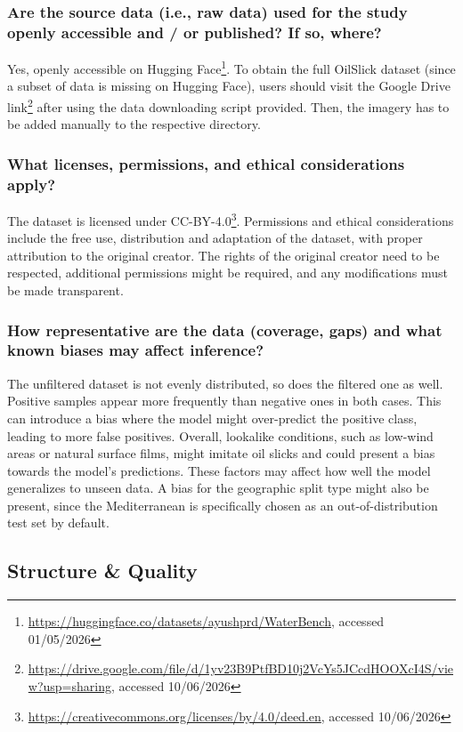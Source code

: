\documentclass[sigconf]{acmart}
\begin{document}
\subsubsection{Are the source data (i.e., raw data) used for the study openly accessible and / or published? If so, where?} Yes, openly accessible on Hugging Face\footnote{\url{https://huggingface.co/datasets/ayushprd/WaterBench}, accessed 01/05/2026}. To obtain the full OilSlick dataset (since a subset of data is missing on Hugging Face), users should visit the Google Drive link\footnote{\url{https://drive.google.com/file/d/1yv23B9PtfBD10j2VcYs5JCcdHOOXcI4S/view?usp=sharing}, accessed 10/06/2026} after using the data downloading script provided. Then, the imagery has to be added manually to the respective directory.
\subsubsection{What licenses, permissions, and ethical considerations apply?} The dataset is licensed under CC-BY-4.0\footnote{\url{https://creativecommons.org/licenses/by/4.0/deed.en}, accessed 10/06/2026}. Permissions and ethical considerations include the free use, distribution and adaptation of the dataset, with proper attribution to the original creator. The rights of the original creator need to be respected, additional permissions might be required, and any modifications must be made transparent.
\subsubsection{How representative are the data (coverage, gaps) and what known biases may affect inference?} The unfiltered dataset is not evenly distributed, so does the filtered one as well. Positive samples appear more frequently than negative ones in both cases. This can introduce a bias where the model might over-predict the positive class, leading to more false positives. Overall, lookalike conditions, such as low-wind areas or natural surface films, might imitate oil slicks and could present a bias towards the model's predictions. These factors may affect how well the model generalizes to unseen data. A bias for the geographic split type might also be present, since the Mediterranean is specifically chosen as an out-of-distribution test set by default.

\subsection{Structure \& Quality}
\end{document}
